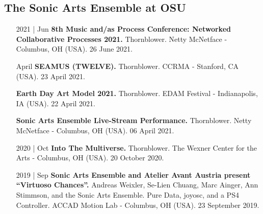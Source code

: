 \documentclass[12pt]{article}%
\begin{document}
\subsection{The Sonic Arts Ensemble at OSU}%
\begin{itemize}[align=parleft,leftmargin=2.25cm,labelwidth=2cm]
\item[2021 | Jun]
\textbf{8th Music and/as Process Conference: Networked Collaborative Processes 2021.}
Thornblower. 
Netty McNetface {-} Columbus, OH (USA). 
26 June 2021.
\end{itemize}%
\begin{itemize}[align=parleft,leftmargin=2.25cm,labelwidth=2cm]
\item[April]
\textbf{SEAMUS (TWELVE).}
Thornblower. 
CCRMA {-} Stanford, CA (USA). 
23 April 2021.
\end{itemize}%
\begin{itemize}[align=parleft,leftmargin=2.25cm,labelwidth=2cm]
\item[]
\textbf{Earth Day Art Model 2021.}
Thornblower. 
EDAM Festival {-} Indianapolis, IA (USA). 
22 April 2021.
\end{itemize}%
\begin{itemize}[align=parleft,leftmargin=2.25cm,labelwidth=2cm]
\item[]
\textbf{Sonic Arts Ensemble Live{-}Stream Performance.}
Thornblower. 
Netty McNetface {-} Columbus, OH (USA). 
06 April 2021.
\end{itemize}%
\begin{itemize}[align=parleft,leftmargin=2.25cm,labelwidth=2cm]
\item[2020 | Oct]
\textbf{Into The Multiverse.}
Thornblower. 
The Wexner Center for the Arts {-} Columbus, OH (USA). 
20 October 2020.
\end{itemize}%
\begin{itemize}[align=parleft,leftmargin=2.25cm,labelwidth=2cm]
\item[2019 | Sep]
\textbf{Sonic Arts Ensemble and Atelier Avant Austria present ``Virtuoso Chances''.}
Andreas Weixler, Se{-}Lien Chuang, Marc Ainger, Ann Stimmson, and the Sonic Arts Ensemble. 
Pure Data, joyosc, and a PS4 Controller. 
ACCAD Motion Lab {-} Columbus, OH (USA). 
23 September 2019.
\end{itemize}%
\end{document}
